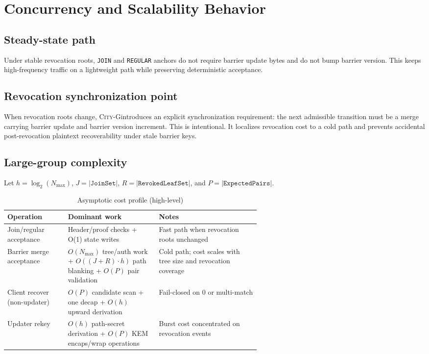 \documentclass[11pt]{article}
\newcommand{\cityg}{\textsc{City-G}}
\begin{document}
\section{Concurrency and Scalability Behavior}
\subsection{Steady-state path}
Under stable revocation roots, \texttt{JOIN} and \texttt{REGULAR} anchors do not require barrier update bytes and do not bump barrier version. This keeps high-frequency traffic on a lightweight path while preserving deterministic acceptance.

\subsection{Revocation synchronization point}
When revocation roots change, \cityg introduces an explicit synchronization requirement: the next admissible transition must be a merge carrying barrier update and barrier version increment. This is intentional. It localizes revocation cost to a cold path and prevents accidental post-revocation plaintext recoverability under stale barrier keys.

\subsection{Large-group complexity}
\noindent Let \(h=\log_2(N_{\max})\), \(J=|\texttt{JoinSet}|\), \(R=|\texttt{RevokedLeafSet}|\), and \(P=|\texttt{ExpectedPairs}|\).
\begin{table}[t]
\centering
\caption{Asymptotic cost profile (high-level)}
\begin{tabularx}{\linewidth}{>{\raggedright\arraybackslash}p{0.24\linewidth} >{\raggedright\arraybackslash}p{0.36\linewidth} >{\raggedright\arraybackslash}X}
\toprule
Operation & Dominant work & Notes \\
\midrule
Join/regular acceptance & Header/proof checks + O(1) state writes & Fast path when revocation roots unchanged \\
Barrier merge acceptance & \(O(N_{\max})\) tree/auth work + \(O((J+R)\cdot h)\) path blanking + \(O(P)\) pair validation & Cold path; cost scales with tree size and revocation coverage \\
Client recover (non-updater) & \(O(P)\) candidate scan + one decap + \(O(h)\) upward derivation & Fail-closed on 0 or multi-match \\
Updater rekey & \(O(h)\) path-secret derivation + \(O(P)\) KEM encaps/wrap operations & Burst cost concentrated on revocation events \\
\bottomrule
\end{tabularx}
\end{table}
\end{document}
